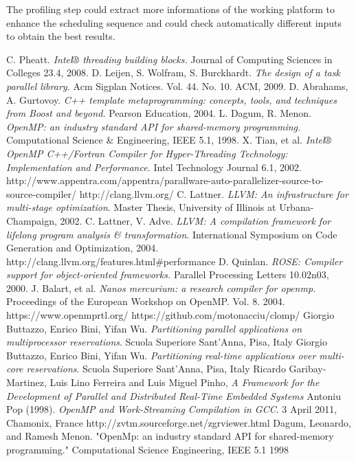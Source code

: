 \documentclass[a4paper,11pt,oneside]{book}
\begin{document}
The profiling step could extract more informations of the working platform to enhance the scheduling sequence and could check automatically different inputs to obtain the best results.

\begin{thebibliography}{30}
 C. Pheatt. \emph{Intel® threading building blocks.} Journal of Computing Sciences in Colleges 23.4, 2008.
 D. Leijen, S. Wolfram, S. Burckhardt. \emph{The design of a task parallel library.} Acm Sigplan Notices. Vol. 44. No. 10. ACM, 2009.
 D. Abrahams, A. Gurtovoy. \emph{C++ template metaprogramming: concepts, tools, and techniques from Boost and beyond.} Pearson Education, 2004.
 L. Dagum, R. Menon. \emph{OpenMP: an industry standard API for shared-memory programming.} Computational Science \& Engineering, IEEE 5.1, 1998.
 X. Tian, et al. \emph{Intel® OpenMP C++/Fortran Compiler for Hyper-Threading Technology: Implementation and Performance.} Intel Technology Journal 6.1, 2002.
 http://www.appentra.com/appentra/parallware-auto-parallelizer-source-to-source-compiler/
http://clang.llvm.org/
 C. Lattner. \emph{LLVM: An infrastructure for multi-stage optimization}. Master Thesis, University of Illinois at Urbana-Champaign, 2002.
 C. Lattner, V. Adve. \emph{LLVM: A compilation framework for lifelong program analysis \& transformation}. International Symposium on Code Generation and Optimization, 2004. 
http://clang.llvm.org/features.html\#performance
 D. Quinlan. \emph{ROSE: Compiler support for object-oriented frameworks.} Parallel Processing Letters 10.02n03, 2000.
 J. Balart, et al. \emph{Nanos mercurium: a research compiler for openmp.} Proceedings of the European Workshop on OpenMP. Vol. 8. 2004.
https://www.openmprtl.org/
https://github.com/motonacciu/clomp/
 Giorgio Buttazzo, Enrico Bini, Yifan Wu. \emph{Partitioning parallel applications on multiprocessor reservations}. Scuola Superiore Sant’Anna, Pisa, Italy
 Giorgio Buttazzo, Enrico Bini, Yifan Wu. \emph{Partitioning real-time applications over multi-core reservations}. Scuola Superiore Sant’Anna, Pisa, Italy
 Ricardo Garibay-Martinez, Luis Lino Ferreira and Luis Miguel Pinho, \emph{A Framework for the Development of Parallel and Distributed Real-Time Embedded Systems}
Antoniu Pop (1998). \emph{OpenMP and Work-Streaming Compilation in GCC}. 3 April 2011, Chamonix, France
http://zvtm.sourceforge.net/zgrviewer.html
Dagum, Leonardo, and Ramesh Menon. "OpenMp: an industry standard API for shared-memory programming." Computational Science  Engineering, IEEE 5.1 1998
\end{thebibliography}
\end{document}
